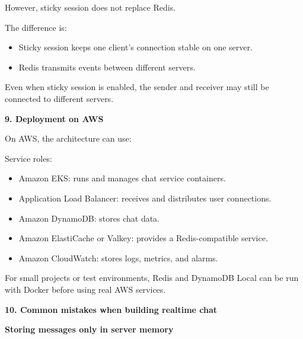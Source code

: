 However, sticky session does not replace Redis.

The difference is:

\begin{itemize}
\tightlist
\item
  Sticky session keeps one client's connection stable on one server.
\item
  Redis transmits events between different servers.
\end{itemize}

Even when sticky session is enabled, the sender and receiver may still
be connected to different servers.

\vspace{0.5em}\noindent\textbf{9. Deployment on AWS}\par

On AWS, the architecture can use:

\begin{Shaded}
\begin{Highlighting}[]
\end{Highlighting}
\end{Shaded}

Service roles:

\begin{itemize}
\tightlist
\item
  Amazon EKS: runs and manages chat service containers.
\item
  Application Load Balancer: receives and distributes user connections.
\item
  Amazon DynamoDB: stores chat data.
\item
  Amazon ElastiCache or Valkey: provides a Redis-compatible service.
\item
  Amazon CloudWatch: stores logs, metrics, and alarms.
\end{itemize}

For small projects or test environments, Redis and DynamoDB Local can be
run with Docker before using real AWS services.

\vspace{0.5em}\noindent\textbf{10. Common mistakes when building realtime
chat}\par

\vspace{0.5em}\noindent\textbf{Storing messages only in server
memory}\par

